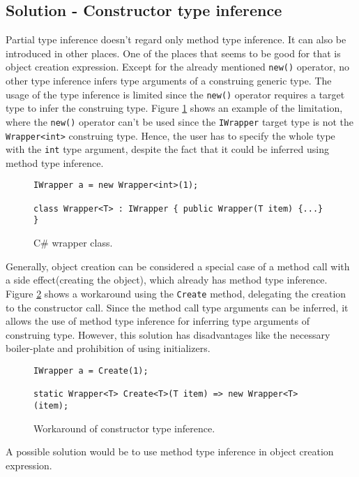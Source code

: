 \subsection{Solution - Constructor type inference}

Partial type inference doesn’t regard only method type inference. 
It can also be introduced in other places. One of the places that seems to be good for that is object creation expression. 
Except for the already mentioned \texttt{new()} operator, no other type inference infers type arguments of a construing generic type. The usage of the type inference is limited since the \texttt{new()} operator requires a target type to infer the construing type. 
Figure \ref{img34:wrapper} shows an example of the limitation, where the \texttt{new()} operator can’t be used since the \texttt{IWrapper} target type is not the \texttt{Wrapper<int>} construing type. 
Hence, the user has to specify the whole type with the \texttt{int} type argument, despite the fact that it could be inferred using method type inference.
\begin{figure}[h]
\begin{lstlisting}[style=csharp]
IWrapper a = new Wrapper<int>(1);

class Wrapper<T> : IWrapper { public Wrapper(T item) {...} }
\end{lstlisting}
\caption{C\# wrapper class.}
\label{img34:wrapper}
\end{figure}
\par
Generally, object creation can be considered a special case of a method call with a side effect(creating the object), which already has method type inference. 
Figure \ref{img35:workaroung} shows a workaround using the \texttt{Create} method, delegating the creation to the constructor call. 
Since the method call type arguments can be inferred, it allows the use of method type inference for inferring type arguments of construing type. 
However, this solution has disadvantages like the necessary boiler-plate and prohibition of using initializers.
\begin{figure}[h]
\begin{lstlisting}[style=csharp]
IWrapper a = Create(1);

static Wrapper<T> Create<T>(T item) => new Wrapper<T>(item);
\end{lstlisting}
\caption{Workaround of constructor type inference.}
\label{img35:workaroung}
\end{figure}
\par
A possible solution would be to use method type inference in object creation expression. 
